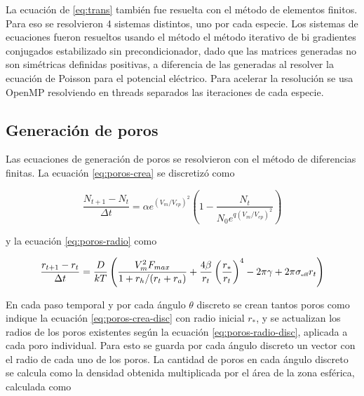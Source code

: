 \documentclass[a4paper,10pt]{article}
\begin{document}
La ecuación de \ref{eq:trans} también fue resuelta con el método de elementos finitos. Para eso se resolvieron 4 sistemas distintos, uno por cada especie. Los sistemas de ecuaciones fueron resueltos usando el método el método iterativo de bi gradientes conjugados estabilizado sin precondicionador, dado que las matrices generadas no son simétricas definidas positivas, a diferencia de las generadas al resolver la ecuación de Poisson para el potencial eléctrico. Para acelerar la resolución se usa OpenMP resolviendo en threads separados las iteraciones de cada especie.\\


\subsection{Generación de poros}

Las ecuaciones de generación de poros se resolvieron con el método de diferencias finitas. La ecuación \ref{eq:poros-crea} se discretizó como

\begin{equation} \label{eq:poros-crea-disc}
	\frac{N_{t+1} - N_{t}}{\Delta t} = \alpha e^{(V_m/V_{ep})^2} \left( 1 - \frac{N_{t}}{N_0 e^{q \left(V_m / V_{ep} \right) ^2}} \right)
\end{equation}

y la ecuación \ref{eq:poros-radio} como

\begin{equation} \label{eq:poros-radio-disc}
	\frac{r_{t+1} - r_t}{\Delta t} = \frac{D}{kT} \left( \frac{V_m^2 F_{max}}{1+r_h / (r_t+r_a)} + \frac{4 \beta}{r_t} \left(\frac{r_*}{r_t}\right)^4 - 2 \pi \gamma + 2 \pi \sigma_{\textrm{\tiny eff}} r_t \right)
\end{equation}

En cada paso temporal y por cada ángulo $\theta$ discreto se crean tantos poros como indique la ecuación \ref{eq:poros-crea-disc} con radio inicial $r_*$, y se actualizan los radios de los poros existentes según la ecuación \ref{eq:poros-radio-disc}, aplicada a cada poro individual. Para esto se guarda por cada ángulo discreto un vector con el radio de cada uno de los poros. La cantidad de poros en cada ángulo discreto se calcula como la densidad obtenida multiplicada por el área de la zona esférica, calculada como 
\end{document}

